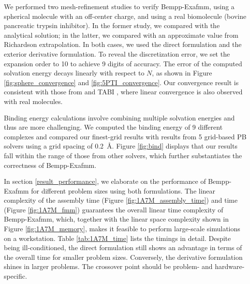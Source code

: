 We performed two mesh-refinement studies to verify Bempp-Exafmm, using a spherical molecule with an off-center charge, and using a real biomolecule (bovine pancreatic trypsin inhibitor).
In the former study, we compared with the analytical solution; in the latter, we compared with an approximate value from Richardson extrapolation.
In both cases, we used the direct formulation and the exterior derivative formulation.
To reveal the discretization error, we set the \fmm expansion order to 10 to achieve 9 digits of accuracy.
The error of the computed solvation energy decays linearly with respect to $N$, as shown in Figure \ref{fig:sphere_convergence} and \ref{fig:5PTI_convergence}.
Our convergence result is consistent with those from \pygbe \cite{CooperBardhanBarba2014} and TABI \cite{GengKrasny2013}, where linear convergence is also observed with real molecules.

Binding energy calculations involve combining multiple solvation energies and thus are more challenging.
We computed the binding energy of 9 different complexes and compared our finest-grid results with results from 5 grid-based PB solvers using a grid spacing of \qty{0.2}{\angstrom}.
Figure \ref{fig:bind} displays that our results fall within the range of those from other solvers, which further substantiates the correctness of Bempp-Exafmm.

In section \ref{result_performance}, we elaborate on the performance of Bempp-Exafmm for different problem sizes using both formulations.
The linear complexity of the assembly time (Figure \ref{fig:1A7M_assembly_time}) and \fmm time (Figure \ref{fig:1A7M_fmm}) guarantees the overall linear time complexity of Bempp-Exafmm, which, together with the linear space complexity shown in Figure \ref{fig:1A7M_memory}, makes it feasible to perform large-scale simulations on a workstation.
Table \ref{tab:1A7M_time} lists the timings in detail.
Despite being ill-conditioned, the direct formulation still shows an advantage in terms of the overall time for smaller problem sizes.
Conversely, the derivative formulation shines in larger problems.
The crossover point should be problem- and hardware-specific.

